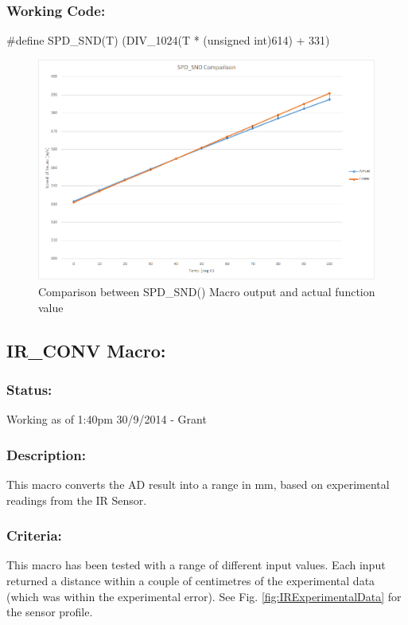 \documentclass[]{article}
\begin{document}
\subsubsection{Working Code:}
\#define SPD\_SND(T) (DIV\_1024(T * (unsigned int)614) + 331)

\begin{figure}
	\centering
	\includegraphics[width=0.7\linewidth]{SND_comp}
	\caption{Comparison between SPD\_SND() Macro output and actual function value}
	\label{fig:SND_comp}
\end{figure}

\subsection{IR\_CONV Macro:}
\subsubsection{Status:}
Working as of 1:40pm 30/9/2014 - Grant

\subsubsection{Description:}
This macro converts the AD result into a range in mm, based on experimental readings from the IR Sensor.

\subsubsection{Criteria:}
This macro has been tested with a range of different input values. Each input returned a distance within a couple of centimetres of the experimental data (which was within the experimental error). See Fig. \ref{fig:IRExperimentalData} for the sensor profile.
\end{document}
